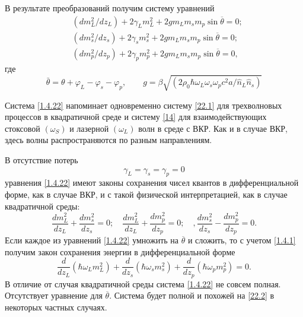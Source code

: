 \documentclass[a4paper]{article}
\begin{document}
В результате преобразований получим систему уравнений 
\begin{equation}
	\begin{split}
		&(dm^{2}_{L}/dz_{L})+2\gamma_{L}m_{L}^{2}+2gm_{L}m_{s}m_{p}\sin\overline{\theta}=0;\\
		&(dm^{2}_{s}/dz_{s})+2\gamma_{s}m_{s}^{2}+2gm_{L}m_{s}m_{p}\sin\overline{\theta}=0;\\
		&(dm^{2}_{p}/dz_{p})+2\gamma_{p}m_{p}^{2}+2gm_{L}m_{s}m_{p}\sin\overline{\theta}=0,
	\end{split}
\label{1.4.22}
\end{equation}
где	$$\bar{\theta}=\theta+\varphi_{L}-\varphi_{s}-\varphi_{p},\qquad g=\beta\sqrt{\left(2\rho_{0}\hbar\omega_{L}\omega_{s}\omega_{p}c^{2}a/\hat{n}_{L}\hat{n}_{s}\right)}$$

Система \eqref{1.4.22} напоминает одновременно систему \eqref{22.1} для трехволновых процессов в квадратичной среде и систему \eqref{14} для взаимодействующих стоксовой $(\omega_{S})$ и лазерной $(\omega_{L})$ волн в среде с ВКР. Как и в случае ВКР, здесь волны распространяются по разным направлениям.

В отсутствие потерь
\begin{equation}
	\gamma_{L}=\gamma_{s}=\gamma_{p}=0
	\label{1.4.23}
\end{equation}
уравнения \eqref{1.4.22} имеют законы сохранения чисел квантов в дифференциальной форме, как в случае ВКР, и с такой физической интерпретацией, как в случае квадратичной среды:
\begin{equation}
	\frac{dm_{L}^{2}}{dz_{L}}+\frac{dm_{s}^{2}}{dz_{s}}=0; \quad \frac{dm_{L}^{2}}{dz_{L}}+\frac{dm_{p}^{2}}{dz_{p}}=0; \quad, \frac{dm_{s}^{2}}{dz_{s}}-\frac{dm_{p}^{2}}{dz_{p}}=0.
	\label{1.4.24}
\end{equation}
Если каждое из уравнений \eqref{1.4.22} умножить на $\overline{\theta}$ и сложить, то с учетом \eqref{1.4.1} получим закон сохранения энергии в дифференциальной форме 
\begin{equation}
	\frac{d}{dz_{L}}(\hbar\omega_{L}m_{L}^{2})+\frac{d}{dz_{s}}(\hbar\omega_{s}m_{s}^{2})+\frac{d}{dz_{p}}(\hbar\omega_{p}m_{p}^{2})=0.
	\tag{24'}
	\label{1.4.24'}
\end{equation}
В отличие от случая квадратичной среды система \eqref{1.4.22} не совсем полная. Отсутствует уравнение для $\overline{\theta}$. Система будет полной и похожей на \eqref{22.2} в некоторых частных случаях.
\end{document}
